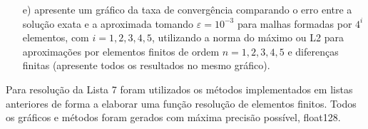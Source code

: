 \documentclass{article}
\begin{document}
\begin{itemize}
\begin{itemize}
\item[e)] apresente um gráfico da taxa de convergência comparando o erro 
entre a solução exata e a aproximada tomando $\varepsilon = 10^{-3}$ 
para malhas formadas por $4^i$ elementos, 
com $i=1,2,3,4,5$, utilizando a norma do máximo ou L2 
para aproximações por elementos finitos de ordem $n=1,2,3,4,5$ e diferenças finitas 
(apresente todos os resultados no mesmo gráfico). 

\end{itemize}

\end{itemize}

\newpage


Para resolução da Lista 7 foram utilizados os métodos implementados em listas anteriores de forma a elaborar uma função resolução de elementos finitos.
Todos os gráficos e métodos foram gerados com máxima precisão possível, float128.
\end{document}
